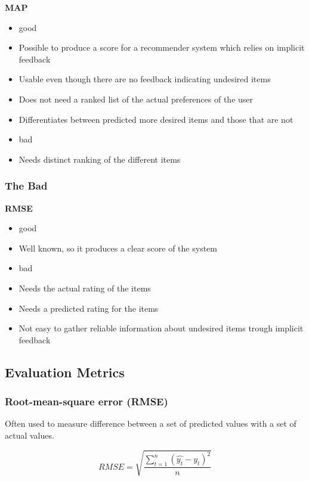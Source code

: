 \textbf{MAP}
\begin{itemize}
	\item good
	\item Possible to produce a score for a recommender system which relies on implicit feedback
	\item Usable even though there are no feedback indicating undesired items
	\item Does not need a ranked list of the actual preferences of the user
	\item Differentiates between predicted more desired items and those that are not
	\item bad
	\item Needs distinct ranking of the different items
\end{itemize}


\subsubsection{The Bad}
\textbf{RMSE}
\begin{itemize}
	\item good
	\item Well known, so it produces a clear score of the system
	\item bad
	\item Needs the actual rating of the items
	\item Needs a predicted rating for the items
	\item Not easy to gather reliable information about undesired items trough implicit feedback
\end{itemize}



\subsection{Evaluation Metrics}

\subsubsection{Root-mean-square error (RMSE)}
Often used to measure difference between a set of predicted values with a set of actual values.

\begin{equation}
	RMSE = \sqrt{\frac{\sum_{t=1}^{n}{(\hat{y_t} - y_t)^{2}}}{n}}
\end{equation}

